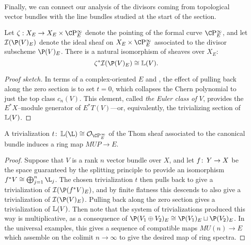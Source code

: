 Finally, we can connect our analysis of the divisors coming from topological vector bundles with the line bundles studied at the start of the section.
\begin{lemma}
Let $\zeta: X_E \to X_E \times \CP^\infty_E$ denote the pointing of the formal curve $\CP^\infty_E$, and let $\sheaf I(\P(V)_E)$ denote the ideal sheaf on $X_E \times \CP^\infty_E$ associated to the divisor subscheme $\P(V)_E$.  There is a natural isomorphism of sheaves over $X_E$: \[\zeta^* \sheaf I(\P(V)_E) \cong \ThomSheaf{V}.\]
\end{lemma}
\begin{proof}[Proof sketch]
In terms of a complex-oriented $E$ and , the effect of pulling back along the zero section is to set $t = 0$, which collapses the Chern polynomial to just the top class $c_n(V)$.  This element, called \textit{the Euler class of $V$}, provides the $E^* X$--module generator of $E^* T(V)$---or, equivalently, the trivializing section of $\mathbb{L}(V)$.
\end{proof}

\begin{theorem}\label{ComplexOrientationsInTermsOfTrivs}
A trivialization $t\co \ThomSheaf{\L} \cong \sheaf O_{\CP^\infty_E}$ of the Thom sheaf associated to the canonical bundle induces a ring map $MUP \to E$.
\end{theorem}
\begin{proof}
Suppose that $V$ is a rank $n$ vector bundle over $X$, and let $f\colon\thinspace Y \to X$ be the space guaranteed by the splitting principle to provide an isomorphism $f^* V \cong \bigoplus_{j=1}^n \L_j$.  The chosen trivialization $t$ then pulls back to give a trivialization of $\sheaf I(\P(f^* V)_E)$, and by finite flatness this descends to also give a trivialization of $\sheaf I(\P(V)_E)$.  Pulling back along the zero section gives a trivialization of $\mathbb{L}(V)$.  Then note that the system of trivializations produced this way is multiplicative, as a consequence of $\P(V_1 \oplus V_2)_E \cong \P(V_1)_E \sqcup \P(V_2)_E$.  In the universal examples, this gives a sequence of compatible maps $MU(n) \to E$ which assemble on the colimit $n \to \infty$ to give the desired map of ring spectra.
\end{proof}










